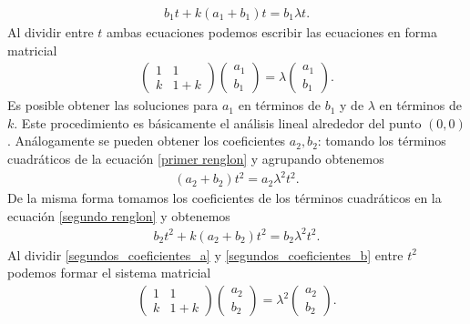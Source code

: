 \begin{eqnarray}
b_{1}t+k(a_{1}+b_{1})t=b_{1}\lambda t.
\end{eqnarray}
Al dividir entre $t$ ambas ecuaciones podemos escribir las ecuaciones en forma matricial
\begin{eqnarray}
\begin{pmatrix}
1 & 1\\
k & 1+k
\end{pmatrix}
\begin{pmatrix}
a_{1}\\
b_{1}
\end{pmatrix}=
\lambda \begin{pmatrix}
a_{1}\\
b_{1}
\end{pmatrix}.
\end{eqnarray}
Es posible obtener las soluciones para $a_{1}$ en términos de $b_{1}$ y de $\lambda$ en términos de $k$. Este procedimiento es básicamente el análisis lineal alrededor del punto $(0,0)$. Análogamente se pueden obtener los coeficientes $a_{2},b_{2}$: tomando los términos cuadráticos de la ecuación \ref{primer renglon} y agrupando obtenemos
\begin{eqnarray}
(a_{2}+b_{2})t^{2}=a_{2}\lambda^{2}t^{2}.
\label{segundos_coeficientes_a}
\end{eqnarray}
De la misma forma tomamos los coeficientes de los términos cuadráticos en la ecuación \ref{segundo renglon} y obtenemos
\begin{eqnarray}
b_{2}t^{2}+k(a_{2}+b_{2})t^{2}=b_{2}\lambda^{2}t^{2}.
\label{segundos_coeficientes_b}
\end{eqnarray}
Al dividir \ref{segundos_coeficientes_a} y \ref{segundos_coeficientes_b} entre $t^{2}$ podemos formar el sistema matricial
\begin{eqnarray}
\begin{pmatrix}
1 & 1\\
k & 1+k
\end{pmatrix}
\begin{pmatrix}
a_{2}\\
b_{2}
\end{pmatrix}=
\lambda^{2} \begin{pmatrix}
a_{2}\\
b_{2}
\end{pmatrix}.
\end{eqnarray}

